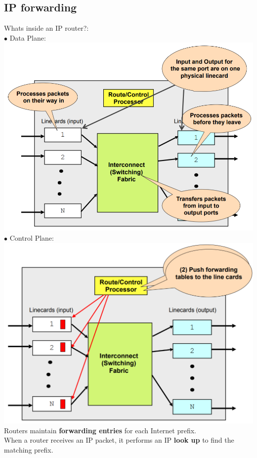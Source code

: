 \documentclass[a4paper, fontsize=8pt, landscape, DIV=1]{scrartcl}
\begin{document}
\begin{multicols*}{4}
   		\subsection{IP forwarding}
   		Whats inside an IP router?:\\
   		$\bullet$ Data Plane:\\
   		\includegraphics[width=\columnwidth]{images/Network_Layer/data_plane.png}
   		$\bullet$ Control Plane:\\
   		\includegraphics[width=\columnwidth]{images/Network_Layer/control_plane.png}
   		Routers maintain \textbf{forwarding entries} for each Internet prefix.\\
   		When a router receives an IP packet, it performs an IP \textbf{look up} to find the matching prefix.\\

\end{multicols*}
\end{document}
